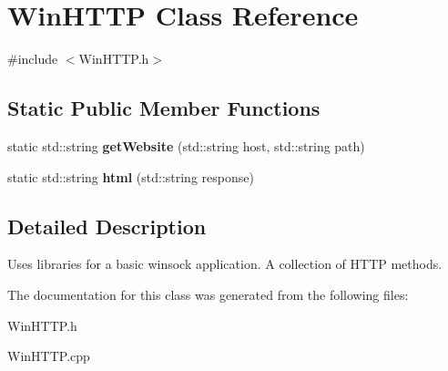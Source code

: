 \hypertarget{class_win_h_t_t_p}{}\section{Win\+H\+T\+TP Class Reference}
\label{class_win_h_t_t_p}


{\ttfamily \#include $<$Win\+H\+T\+T\+P.\+h$>$}

\subsection*{Static Public Member Functions}
\begin{DoxyCompactItemize}
\item 
\mbox{\label{class_win_h_t_t_p_a85e23c7eee92f8841fb25e9e449cfee1}} 
static std\+::string {\bfseries get\+Website} (std\+::string host, std\+::string path)
\item 
\mbox{\label{class_win_h_t_t_p_a37afa3b3fdb8e4172af39d6fd729442d}} 
static std\+::string {\bfseries html} (std\+::string response)
\end{DoxyCompactItemize}


\subsection{Detailed Description}
Uses libraries for a basic winsock application. A collection of H\+T\+TP methods. 

The documentation for this class was generated from the following files\+:\begin{DoxyCompactItemize}
\item 
Win\+H\+T\+T\+P.\+h\item 
Win\+H\+T\+T\+P.\+cpp\end{DoxyCompactItemize}

